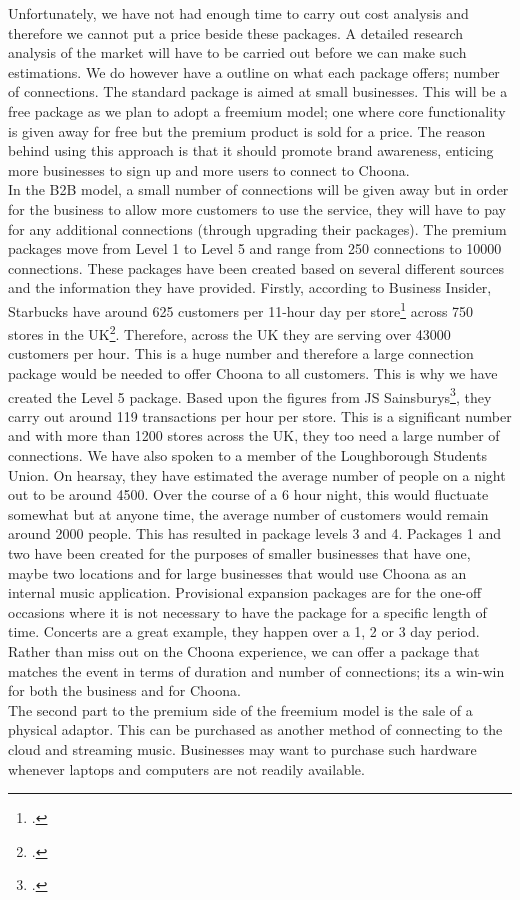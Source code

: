 Unfortunately, we have not had enough time to carry out cost analysis and therefore we cannot put a price beside these packages.  A detailed research analysis of the market will have to be carried out before we can make such estimations.  We do however have a outline on what each package offers; number of connections.  The standard package is aimed at small businesses.  This will be a free package as we plan to adopt a freemium model; one where core functionality is given away for free but the premium product is sold for a price.  The reason behind using this approach is that it should promote brand awareness, enticing more businesses to sign up and more users to connect to Choona.  \\
In the B2B model, a small number of connections will be given away but in order for the business to allow more customers to use the service, they will have to pay for any additional connections (through upgrading their packages).  The premium packages move from Level 1 to Level 5 and range from 250 connections to 10000 connections. These packages have been created based on several different sources and the information they have provided.  Firstly, according to Business Insider, Starbucks have around 625 customers per 11-hour day per store\footcite{starbucks} across 750 stores in the UK\footcite{starbucks_more}.  Therefore, across the UK they are serving over 43000 customers per hour.  This is a huge number and therefore a large connection package would be needed to offer Choona to all customers.  This is why we have created the Level 5 package.  Based upon the figures from JS Sainsburys\footcite{sainsburys}, they carry out around 119 transactions per hour per store.  This is a significant number and with more than 1200 stores across the UK, they too need a large number of connections.  We have also spoken to a member of the Loughborough Students Union.  On hearsay, they have estimated the average number of people on a night out to be around 4500.  Over the course of a 6 hour night, this would fluctuate somewhat but at anyone time, the average number of customers would remain around 2000 people.  This has resulted in package levels 3 and 4.  Packages 1 and two have been created for the purposes of smaller businesses that have one, maybe two locations and for large businesses that would use Choona as an internal music application.  Provisional expansion packages are for the one-off occasions where it is not necessary to have the package for a specific length of time.  Concerts are a great example, they happen over a 1, 2 or 3 day period.  Rather than miss out on the Choona experience, we can offer a package that matches the event in terms of duration and number of connections; its a win-win for both the business and for Choona.\\
The second part to the premium side of the freemium model is the sale of a physical adaptor.  This can be purchased as another method of connecting to the cloud and streaming music.  Businesses may want to purchase such hardware whenever laptops and computers are not readily available. \\

